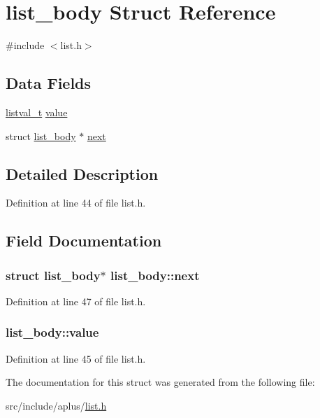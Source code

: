 \hypertarget{structlist__body}{\section{list\+\_\+body Struct Reference}
\label{structlist__body}
}


{\ttfamily \#include $<$list.\+h$>$}

\subsection*{Data Fields}
\begin{DoxyCompactItemize}
\item 
\hyperlink{list_8h_a83bc1af7566502e08756b8d8c425972e}{listval\+\_\+t} \hyperlink{structlist__body_ae3194d24911b82410a61d50f5e6f588d}{value}
\item 
struct \hyperlink{structlist__body}{list\+\_\+body} $\ast$ \hyperlink{structlist__body_ae0f31e0790456c070895880578d171ca}{next}
\end{DoxyCompactItemize}


\subsection{Detailed Description}


Definition at line 44 of file list.\+h.



\subsection{Field Documentation}
\hypertarget{structlist__body_ae0f31e0790456c070895880578d171ca}{
\subsubsection[{next}]{\setlength{\rightskip}{0pt plus 5cm}struct {\bf list\+\_\+body}$\ast$ list\+\_\+body\+::next}}\label{structlist__body_ae0f31e0790456c070895880578d171ca}


Definition at line 47 of file list.\+h.

\hypertarget{structlist__body_ae3194d24911b82410a61d50f5e6f588d}{
\subsubsection[{value}]{ list\+\_\+body\+::value}}\label{structlist__body_ae3194d24911b82410a61d50f5e6f588d}


Definition at line 45 of file list.\+h.



The documentation for this struct was generated from the following file\+:\begin{DoxyCompactItemize}
\item 
src/include/aplus/\hyperlink{list_8h}{list.\+h}\end{DoxyCompactItemize}
